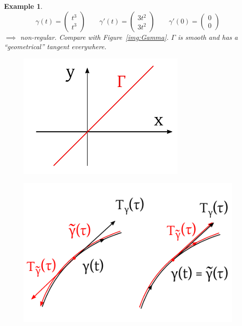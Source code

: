 \documentclass{article}
\newtheorem{example}{Example}  \numberwithin{example}{section}
\begin{document}
\begin{example}
  \[ \gamma(t) = \begin{pmatrix} t^3 \\ t^3 \end{pmatrix} \qquad \gamma'(t) = \begin{pmatrix} 3t^2 \\ 3t^2 \end{pmatrix} \qquad \gamma'(0) = \begin{pmatrix} 0 \\ 0 \end{pmatrix} \]
  $\implies$ non-regular.
  Compare with Figure~\ref{img:Gamma}.
  $\Gamma$ is smooth and has a \enquote{geometrical} tangent everywhere.
  \begin{figure}[t]
    \begin{minipage}{0.5\textwidth}
      \centering
        \includegraphics[width=.95\linewidth]{img/54a_gamma.pdf}
        \label{img:Gamma}
    \end{minipage}
    \begin{minipage}{0.5\textwidth}
      \centering
        \includegraphics[width=.95\linewidth]{img/45b_orientation.pdf}
        \label{img:ori}
    \end{minipage}
  \end{figure}
\end{example}
\end{document}
